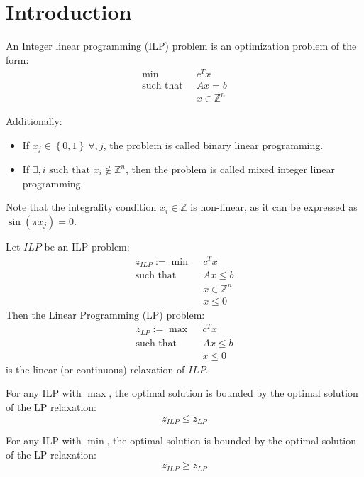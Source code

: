 \section{Introduction}

\begin{definition}
    An Integer linear programming (ILP) problem is an optimization problem of the form:
    \begin{align*}
        \min                      \:&\: c^Tx           \\
        \text{such that }     &\: Ax = b         \\
                                    &\: x \in \mathbb{Z}^n
    \end{align*}  
\end{definition}
Additionally:
\begin{itemize}
  \item If $x_j \in \left\{ 0, 1 \right\} \: \forall, j$, the problem is called binary linear programming.
  \item If $\exists, i \text{ such that }x_i \notin \mathbb{Z}^n$, then the problem is called mixed integer linear programming.
\end{itemize}
Note that the integrality condition $x_i \in \mathbb{Z}$ is non-linear, as it can be expressed as $\sin(\pi x_j)=0$.
\begin{definition}
    Let $ILP$ be an ILP problem:
    \begin{align*}
        z_{ILP}:=\min                      \:&\: c^Tx           \\
        \text{such that }     &\: Ax \leq b               \\
                                    &\: x \in \mathbb{Z}^n      \\
                                    &\: x \leq 0
    \end{align*}  
    Then the Linear Programming (LP) problem:
    \begin{align*}
        z_{LP}:=\max                      \:&\: c^Tx                    \\
        \text{such that }             &\: Ax \leq b               \\
                                            &\: x \leq 0
    \end{align*}  
    is the linear (or continuous) relaxation of $ILP$.
\end{definition}
\begin{property}  
    For any ILP with $\max$, the optimal solution is bounded by the optimal solution of the LP relaxation:
    \[ z_{ILP} \leq z_{LP} \]
  
    For any ILP with $\min$, the optimal solution is bounded by the optimal solution of the LP relaxation:
    \[ z_{ILP} \geq z_{LP} \]
\end{property}
